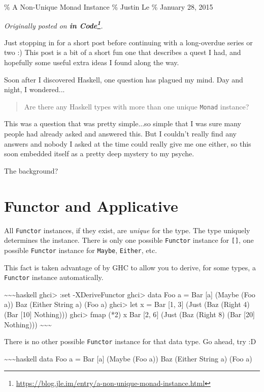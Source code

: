\documentclass[]{article}
\renewcommand{\href}[2]{#2\footnote{\url{#1}}}
\begin{document}
\% A Non-Unique Monad Instance \% Justin Le \% January 28, 2015

\emph{Originally posted on
\textbf{\href{https://blog.jle.im/entry/a-non-unique-monad-instance.html}{in
Code}}.}

Just stopping in for a short post before continuing with a long-overdue series
or two :) This post is a bit of a short fun one that describes a quest I had,
and hopefully some useful extra ideas I found along the way.

Soon after I discovered Haskell, one question has plagued my mind. Day and
night, I wondered...

\begin{quote}
Are there any Haskell types with more than one unique \texttt{Monad} instance?
\end{quote}

This was a question that was pretty simple...so simple that I was sure many
people had already asked and answered this. But I couldn't really find any
answers and nobody I asked at the time could really give me one either, so this
soon embedded itself as a pretty deep mystery to my psyche.

The background?

\section{Functor and Applicative}

All \texttt{Functor} instances, if they exist, are \emph{unique} for the type.
The type uniquely determines the instance. There is only one possible
\texttt{Functor} instance for \texttt{{[}{]}}, one possible \texttt{Functor}
instance for \texttt{Maybe}, \texttt{Either}, etc.

This fact is taken advantage of by GHC to allow you to derive, for some types, a
\texttt{Functor} instance automatically.

\textasciitilde{}\textasciitilde{}\textasciitilde{}haskell ghci\textgreater{}
:set -XDeriveFunctor ghci\textgreater{} data Foo a = Bar {[}a{]} (Maybe (Foo a))
\textbar{} Baz (Either String a) (Foo a) ghci\textgreater{} let x = Bar {[}1,
3{]} (Just (Baz (Right 4) (Bar {[}10{]} Nothing))) ghci\textgreater{} fmap (*2)
x Bar {[}2, 6{]} (Just (Baz (Right 8) (Bar {[}20{]} Nothing)))
\textasciitilde{}\textasciitilde{}\textasciitilde{}

There is no other possible \texttt{Functor} instance for that data type. Go
ahead, try :D

\textasciitilde{}\textasciitilde{}\textasciitilde{}haskell data Foo a = Bar
{[}a{]} (Maybe (Foo a)) \textbar{} Baz (Either String a) (Foo a)
\end{document}
